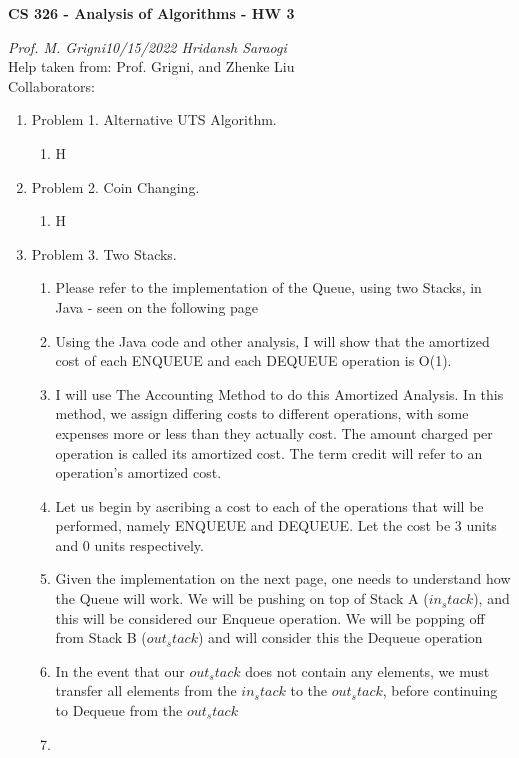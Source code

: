 \documentclass[11pt]{article}
\begin{document}
\begin{center}
    \textbf{CS 326 - Analysis of Algorithms - HW 3}\\
\end{center}


\begin{flushleft}
    \textit{Prof. M. Grigni\hfill10/15/2022 \hfill Hridansh Saraogi} \\
    \vspace{0.15cm}
    \small {Help taken from: Prof. Grigni, and Zhenke Liu}\\
    \small {Collaborators: }
\end{flushleft}


\begin{enumerate}

\item Problem 1. Alternative UTS Algorithm. 
    \begin{enumerate}
        \item H
        
    \end{enumerate}
\pagebreak

\item Problem 2. Coin Changing.
    \begin{enumerate}
        \item H
    \end{enumerate}

\pagebreak

\item Problem 3. Two Stacks.
    \begin{enumerate}
        \item Please refer to the implementation of the Queue, using two Stacks, in Java - seen on the following page
        \item Using the Java code and other analysis, I will show that the amortized cost of each ENQUEUE and each DEQUEUE operation is O(1).
        \item I will use The Accounting Method to do this Amortized Analysis. In this method, we assign differing costs to different operations, with some expenses more or less than they actually cost. The amount charged per operation is called its amortized cost. The term credit will refer to an operation's amortized cost.
        \item Let us begin by ascribing a cost to each of the operations that will be performed, namely ENQUEUE and DEQUEUE. Let the cost be 3 units and 0 units respectively. 
        \item Given the implementation on the next page, one needs to understand how the Queue will work. We will be pushing on top of Stack A ($in_stack$), and this will be considered our Enqueue operation. We will be popping off from Stack B ($out_stack$) and will consider this the Dequeue operation
        \item In the event that our $out_stack$ does not contain any elements, we must transfer all elements from the $in_stack$ to the $out_stack$, before continuing to Dequeue from the $out_stack$
        \item 


\end{enumerate}
\end{enumerate}
\end{document}
